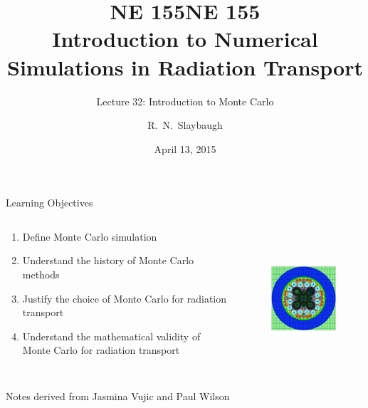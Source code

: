 \documentclass[xcolor=x11names,compress]{beamer}
\title{NE 155}
\author{R.\ N.\ Slaybaugh}
\date{April 13, 2015}
\renewcommand{\(}{\begin{columns}}
\renewcommand{\)}{\end{columns}}
\newcommand{\<}[1]{\begin{column}{#1}}
\renewcommand{\>}{\end{column}}
\begin{document}
\begin{frame}
\title{NE 155\\Introduction to Numerical Simulations in Radiation Transport}
\subtitle{Lecture 32: Introduction to Monte Carlo}
\titlepage
\end{frame}

\begin{frame}{Learning Objectives}

\begin{columns}
  \begin{column}{0.5\textwidth}
    \begin{enumerate}
    \item Define Monte Carlo simulation
    \item Understand the history of Monte Carlo methods
    \item Justify the choice of Monte Carlo for radiation transport
    \item Understand the mathematical validity of Monte Carlo for radiation transport
    \end{enumerate}
  \end{column}
  \begin{column}{0.5\textwidth}
  	\begin{figure}
  	\begin{center}
  		\includegraphics[height=2in,clip]{atr-model}
	\end{center}
  	\end{figure}
  \end{column}
\end{columns}

Notes derived from Jasmina Vujic and Paul Wilson
\end{frame}
\end{document}
